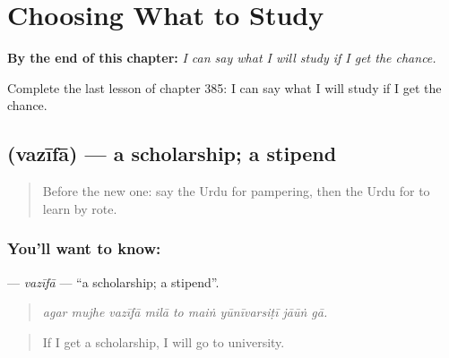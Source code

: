 
\chapter{Choosing What to Study}
\label{ch:ur-choosing-what-to-study}

\begin{chapteropening}
\textbf{By the end of this chapter:} \emph{I can say what I will study if I get the chance.}

Complete the last lesson of chapter 385: I can say what I will study if I get the chance.
\end{chapteropening}

\section[\texorpdfstring{\ur{وظیفہ} (vazīfā)}{وظیفہ (vazīfā)}]{ (vazīfā) — a scholarship; a stipend}

\label{lesson:UR-C385-vazifa}



\begin{quote}
Before the new one: say the Urdu for pampering, then the Urdu for to learn by rote.
\end{quote}

\subsection*{You'll want to know: }
\textbf{} — \emph{vazīfā} — \textquotedblleft{}a scholarship; a stipend\textquotedblright{}.

\begin{quote}
        
\end{quote}

\begin{quote}
\emph{agar mujhe vazīfā milā to maiṅ yūnīvarsiṭī jāūṅ gā.}
\end{quote}

\begin{quote}
If I get a scholarship, I will go to university.
\end{quote}

